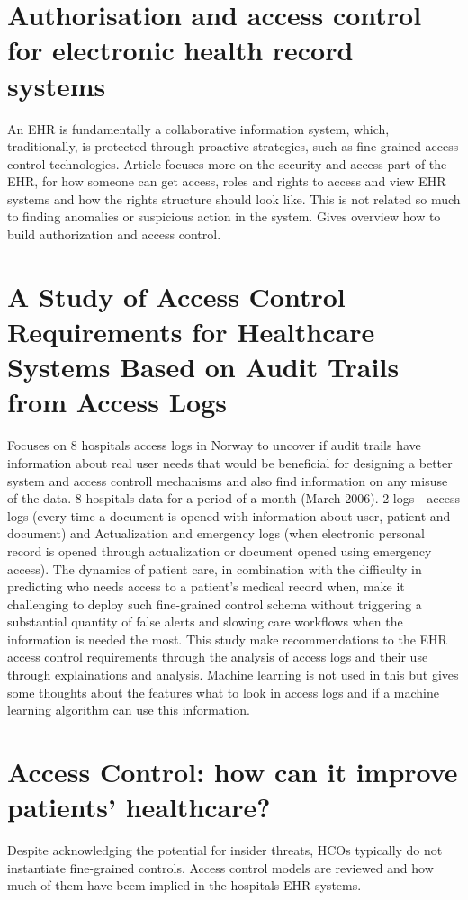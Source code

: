 \documentclass[12pt]{article}
\begin{document}
\section{Authorisation and access control for electronic health record systems}
An EHR is fundamentally a collaborative information system, which, traditionally, is protected through proactive strategies, such as fine-grained access control technologies. \cite{BLOBEL2004251} 
Article focuses more on the security and access part of the EHR, for how someone can get access, roles and rights to access and view EHR systems and how the rights structure should look like. This is not related so much to finding anomalies or suspicious action in the system. Gives overview how to build authorization and access control.  

\section{A Study of Access Control Requirements for Healthcare Systems Based on Audit Trails from Access Logs}
Focuses on 8 hospitals access logs in Norway to uncover if audit trails have information about real user needs that would be beneficial for designing a better system and access controll mechanisms and also find information on any misuse of the data.
8 hospitals data for a period of a month (March 2006).
2 logs - access logs (every time a document is opened with information about user, patient and document) and Actualization and emergency logs (when electronic personal record is opened through actualization or document opened using emergency access).
The dynamics of patient care, in combination with the difficulty in predicting who needs access to a patient’s medical record when, make it challenging to deploy such fine-grained control schema without
triggering a substantial quantity of false alerts and slowing care workflows when the information is needed the most.  
\cite{4041165} 
This study make recommendations to the EHR access control requirements through the analysis of access logs and their use through explainations and analysis. Machine learning is not used in this but gives some thoughts about the features what to look in access logs and if a machine learning algorithm can use this information.  

\section{Access Control: how can it improve	patients’ healthcare?}
Despite acknowledging the potential for insider threats, HCOs typically do not instantiate fine-grained controls.  \cite{ferreiraabd2007access}  
Access control models are reviewed and how much of them have beem implied in the hospitals EHR systems. 
\end{document}
